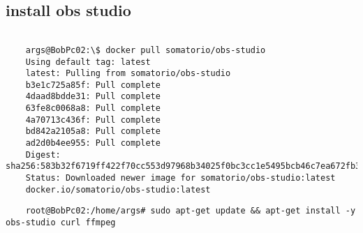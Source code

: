 \documentclass[../main.tex]{subfiles}
\begin{document}
\subsection{install obs studio}
\begin{lstlisting}
	
	args@BobPc02:\$ docker pull somatorio/obs-studio
	Using default tag: latest
	latest: Pulling from somatorio/obs-studio
	b3e1c725a85f: Pull complete 
	4daad8bdde31: Pull complete 
	63fe8c0068a8: Pull complete 
	4a70713c436f: Pull complete 
	bd842a2105a8: Pull complete 
	ad2d0b4ee955: Pull complete 
	Digest: sha256:583b32f6719ff422f70cc553d97968b34025f0bc3cc1e5495bcb46c7ea672fb3
	Status: Downloaded newer image for somatorio/obs-studio:latest
	docker.io/somatorio/obs-studio:latest
\end{lstlisting}

\begin{lstlisting}
	root@BobPc02:/home/args# sudo apt-get update && apt-get install -y obs-studio curl ffmpeg
\end{lstlisting}
\end{document}
